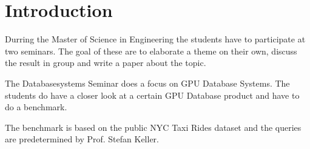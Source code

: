 \chapter{Introduction}
\label{introduction}

Durring the Master of Science in Engineering the students have to participate at two seminars.
The goal of these are to elaborate a theme on their own, discuss the result in group and write a paper about the topic.

The Databasesystems Seminar does a focus on GPU Database Systems.
The students do have a closer look at a certain GPU Database product and have to do a benchmark.

The benchmark is based on the public NYC Taxi Rides dataset and the queries are predetermined by Prof. Stefan Keller.
